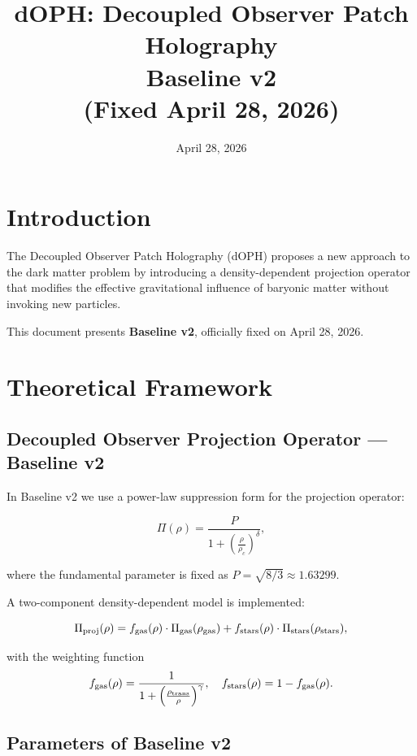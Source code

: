\documentclass[11pt,a4paper]{article}
\title{dOPH: Decoupled Observer Patch Holography \\ 
       \textbf{Baseline v2} \\ 
       (Fixed April 28, 2026)}
\author{}
\date{April 28, 2026}
\begin{document}
\maketitle
\tableofcontents

\section{Introduction}

The Decoupled Observer Patch Holography (dOPH) proposes a new approach to the dark matter problem by introducing a density-dependent projection operator that modifies the effective gravitational influence of baryonic matter without invoking new particles.

This document presents \textbf{Baseline v2}, officially fixed on April 28, 2026.

\section{Theoretical Framework}

\subsection{Decoupled Observer Projection Operator — Baseline v2}

In Baseline v2 we use a power-law suppression form for the projection operator:

\begin{equation}
\Pi(\rho) = \frac{P}{1 + \left( \frac{\rho}{\rho_c} \right)^\delta},
\end{equation}

where the fundamental parameter is fixed as \( P = \sqrt{8/3} \approx 1.63299 \).

A two-component density-dependent model is implemented:

\begin{equation}
\Pi_{\rm proj}(\rho) = f_{\rm gas}(\rho) \cdot \Pi_{\rm gas}(\rho_{\rm gas}) + f_{\rm stars}(\rho) \cdot \Pi_{\rm stars}(\rho_{\rm stars}),
\end{equation}

with the weighting function
\begin{equation}
f_{\rm gas}(\rho) = \frac{1}{1 + \left( \frac{\rho_{\rm trans}}{\rho} \right)^\gamma}, \quad 
f_{\rm stars}(\rho) = 1 - f_{\rm gas}(\rho).
\end{equation}

\subsection{Parameters of Baseline v2}
\end{document}
